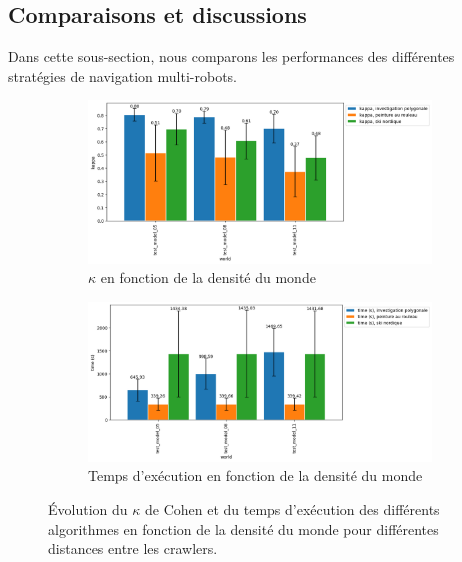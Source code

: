 \documentclass[francais,RandD]{rapportPFE}
\begin{document}
		\subsection*{Comparaisons et discussions}
			Dans cette sous-section, nous comparons les performances des différentes stratégies de navigation multi-robots.

			\begin{figure}[h!]
				\begin{subfigure}[t]{0.9\linewidth}
					\includegraphics[width=\linewidth]{graphics/investigation_polygonale-peinture_au_rouleau_ski_nordique-kappa_for_each_world_vs_investigation_polygonale-kappa_for_each_world.png}
					\caption{$\kappa$ en fonction de la densité du monde}
					\label{fig:investigation_polygonale-peinture_au_rouleau_ski_nordique-kappa_for_each_world_vs_investigation_polygonale-kappa_for_each_d}
				\end{subfigure}
				\hfill
				\begin{subfigure}[t]{0.9\linewidth}
						\includegraphics[width=\linewidth]{graphics/investigation_polygonale-peinture_au_rouleau_ski_nordique-time_for_each_world_vs_investigation_polygonale-time_for_each_world.png}
						\caption{Temps d'exécution en fonction de la densité du monde}
						\label{fig:investigation_polygonale-peinture_au_rouleau_ski_nordique-time_for_each_world_vs_investigation_polygonale-time_for_each_d}
				\end{subfigure}
				\caption{Évolution du $\kappa$ de Cohen et du temps d'exécution des différents algorithmes en fonction de la densité du monde pour différentes distances entre les crawlers.}
				\label{fig:investigation_polygonale-peinture_au_rouleau_ski_nordique_for_each_world}
			\end{figure}
\end{document}
